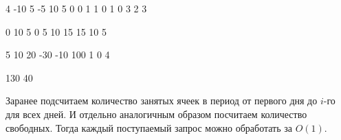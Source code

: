 
\begin{myverbbox}[\small]{\vinput}
    4
    -10 5 -5 10
    5
    0 0
    1 1
    0 1
    0 3
    2 3
\end{myverbbox}

\begin{myverbbox}[\small]{\voutput}
    0 10
    5 0
    5 10
    15 15
    10 5
\end{myverbbox}


\begin{myverbbox}[\small]{\vinput}
    5
    10 20 -30 -10 100
    1
    0 4
\end{myverbbox}

\begin{myverbbox}[\small]{\voutput}
    130 40
\end{myverbbox}

\solutionSection

Заранее подсчитаем количество занятых ячеек в период от первого дня до $i$-го для всех дней. И отдельно аналогичным образом посчитаем количество свободных. Тогда каждый поступаемый запрос можно обработать за $O(1)$.


